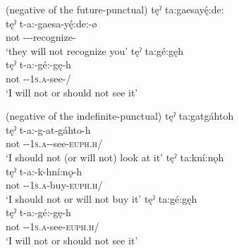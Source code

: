 \ea\label{ex:negationex7}  (negative of the future-punctual)
\ea tęˀ ta:gaesayę́:de:  \\
\gll tęˀ t-a:-gaesa-yę́:de:-ø\\
not {\contrastive}-{\indefinite}--recognize-{\noaspect}\\
\glt ‘they will not recognize you’
\ex tęˀ ta:gé:gęh\\
\gll tęˀ t-a:-gé:-gę-h\\
 not {\contrastive}-{\indefinite}-\textsc{1s.a}-see-/{\noaspect}\\
\glt `I will not or should not see it'
\z
\z

\ea\label{ex:negationex8}  (negative of the indefinite-punctual)
\ea tęˀ ta:gatgáhtoh\\
\gll tęˀ t-a:-g-at-gáhto-h\\
 not  {\contrastive}-{\indefinite}-\textsc{1s.a}-{\semireflexive}-see-\textsc{euph.h}/{\noaspect}\\
\glt `I should not (or will not) look at it'
\ex tęˀ ta:kní:nǫh  \\
\gll tęˀ t-a:-k-hní:nǫ-h\\
not {\contrastive}-{\indefinite}-\textsc{1s.a}-buy-\textsc{euph.h}/{\noaspect}\\
\glt ‘I should not or will not buy it’
\ex tęˀ ta:gé:gęh\\
\gll tęˀ t-a:-gé:-gę-h\\
 not  {\contrastive}-{\indefinite}-\textsc{1s.a}-see-\textsc{euph.h}/{\noaspect}\\
\glt `I will not or should not see it'
\z
\z




